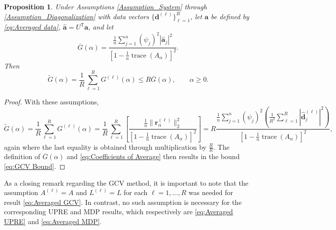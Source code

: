 \documentclass[12pt]{article}
\newcommand{\aVec}{\mathbf{a}}	%
\newcommand{\dVec}{\mathbf{d}}	%
\newcommand{\trans}[1]{{#1}^\mathsf{T}}	%
\DeclareMathOperator{\trace}{trace}		%
\newcommand{\dft}[1]{\widehat{#1}}	%
\newcommand{\regparam}{\alpha}  %
\newcommand{\mfilt}{\psi}
\newcommand{\regres}{\mathbf{r}_{\regparam}}	%
\newcommand{\A}{A_{\regparam}}	%
\newcommand{\G}{G}	%
\newtheorem{proposition}{Proposition}[section]
\begin{document}
\begin{proposition}
Under Assumptions \ref{Assumption_System} through \ref{Assumption_Diagonalization} with data vectors $\{\dVec^{(\ell)}\}_{\ell=1}^R$, let $\aVec$ be defined by \eqref{eq:Averaged data}, $\dft{\aVec} = \trans{U}\aVec$, and let
\begin{equation}
\label{eq:GCV of Average}
\overline{\G}(\regparam) = \frac{\frac{1}{n}\sum_{j=1}^{n} \left(\mfilt_j\right)^2|\dft{\aVec}_j|^2}{\left[1 - \frac{1}{n}\trace\left(\A\right)\right]^2}.
\end{equation}
Then
\begin{equation}
\label{eq:GCV Bound}
\widetilde{\G}(\regparam) = \frac{1}{R} \sum_{\ell=1}^R \G^{(\ell)}(\regparam) \leq R \overline{\G}(\regparam), \qquad \regparam \geq 0.
\end{equation}
\end{proposition}

\begin{proof}
With these assumptions,
\[\widetilde{\G}(\regparam) = \frac{1}{R} \sum_{\ell=1}^R \G^{(\ell)}(\regparam) = \frac{1}{R}\sum_{\ell=1}^R \left[\frac{\frac{1}{n}\|\regres^{(\ell)}\|_2^2}{\left[1 - \frac{1}{n}\trace\left(\A\right)\right]^2}\right]  = R\frac{\frac{1}{n}\sum_{j=1}^{n} \left(\mfilt_j\right)^2\left(\frac{1}{R^2} \sum_{\ell=1}^R |\dft{\dVec}_j^{(\ell)}|^2\right)}{\left[1 - \frac{1}{n}\trace\left(\A\right)\right]^2},\]
again where the last equality is obtained through multiplication by $\frac{R}{R}$. The definition of $\overline{\G}(\regparam)$ and \eqref{eq:Coefficients of Average} then results in the bound \eqref{eq:GCV Bound}.
\end{proof}

As a closing remark regarding the GCV method, it is important to note that the assumption $A^{(\ell)} = A$ and $L^{(\ell)} = L$ for each $\ell = 1,\ldots,R$ was needed for result \eqref{eq:Averaged GCV}. In contrast, no such assumption is necessary for the corresponding UPRE and MDP results, which respectively are \eqref{eq:Averaged UPRE} and \eqref{eq:Averaged MDP}.
\end{document}
